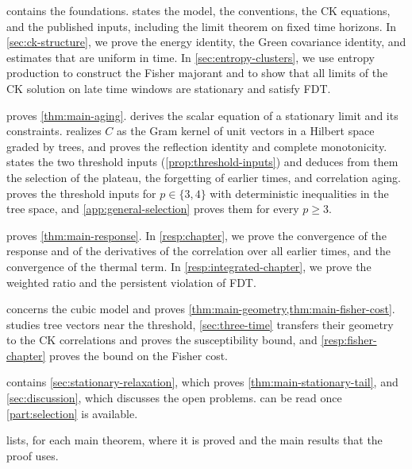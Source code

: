  contains the foundations.  states the model, the conventions, the CK equations, and the published inputs, including the limit theorem on fixed time horizons. In \cref{sec:ck-structure}, we prove the energy identity, the Green covariance identity, and estimates that are uniform in time. In \cref{sec:entropy-clusters}, we use entropy production to construct the Fisher majorant and to show that all limits of the CK solution on late time windows are stationary and satisfy FDT.

 proves \cref{thm:main-aging}.  derives the scalar equation of a stationary limit and its constraints.  realizes $C$ as the Gram kernel of unit vectors in a Hilbert space graded by trees, and proves the reflection identity and complete monotonicity.  states the two threshold inputs (\cref{prop:threshold-inputs}) and deduces from them the selection of the plateau, the forgetting of earlier times, and correlation aging.  proves the threshold inputs for $p\in\{3,4\}$ with deterministic inequalities in the tree space, and \cref{app:general-selection} proves them for every $p\ge3$.

 proves \cref{thm:main-response}. In \cref{resp:chapter}, we prove the convergence of the response and of the derivatives of the correlation over all earlier times, and the convergence of the thermal term. In \cref{resp:integrated-chapter}, we prove the weighted ratio and the persistent violation of FDT.

 concerns the cubic model and proves \cref{thm:main-geometry,thm:main-fisher-cost}.  studies tree vectors near the threshold, \cref{sec:three-time} transfers their geometry to the CK correlations and proves the susceptibility bound, and \cref{resp:fisher-chapter} proves the bound on the Fisher cost.

 contains \cref{sec:stationary-relaxation}, which proves \cref{thm:main-stationary-tail}, and \cref{sec:discussion}, which discusses the open problems.  can be read once \cref{part:selection} is available.

 lists, for each main theorem, where it is proved and the main results that the proof uses.

